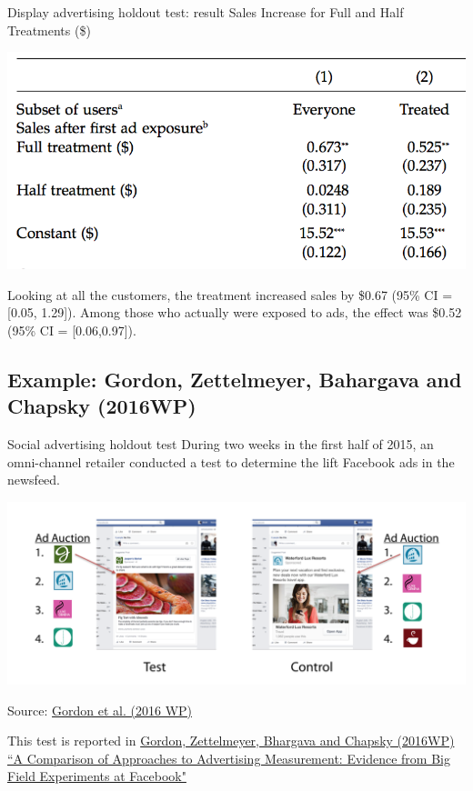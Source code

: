\documentclass[10pt, aspectratio=169]{beamer}
\newcommand{\source}[1]{\begin{flushright} \footnotesize Source: {#1} \end{flushright} \normalsize}
\begin{document}
\begin{frame}{Display advertising holdout test: result}
Sales Increase for Full and Half Treatments (\$)
\begin{center}
\includegraphics[height=0.5\textheight]{images/johnsonetalresult.png}
\end{center}
\alert{Looking at all the customers, the treatment increased sales by \$0.67 (95\% CI = [0.05, 1.29]). Among those who actually were exposed to ads, the effect was \$0.52 (95\% CI = [0.06,0.97]).}
\end{frame}

\subsection{Example: Gordon, Zettelmeyer, Bahargava and Chapsky (2016WP)}

\begin{frame}{Social advertising holdout test}
During two weeks in the first half of 2015, an omni-channel retailer conducted a test to determine the lift Facebook ads in the newsfeed. 
\begin{center}
\includegraphics[height=0.5\textheight]{images/gordonetaltreatmentcontrol2.png}\\
\source{\href{https://drive.google.com/uc?export=download&id=0B0EzanlzLNsWU1BkWnFxZlZuZUE}{Gordon et al. (2016 WP)}}
\end{center}
This test is reported in \href{https://drive.google.com/uc?export=download&id=0B0EzanlzLNsWU1BkWnFxZlZuZUE}{Gordon, Zettelmeyer, Bhargava and Chapsky (2016WP) ``A Comparison of Approaches to Advertising Measurement: Evidence from Big Field Experiments at Facebook"}
\end{frame}
\end{document}
